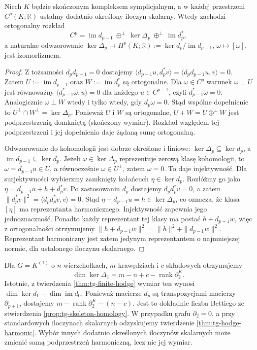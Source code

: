 \begin{twierdzenie}
\label{thm:tg-finite-hodge}
Niech $K$ będzie skończonym kompleksem symplicjalnym,
a w każdej przestrzeni $C^p(K;\mathbb R)$ ustalmy
dodatnio określony iloczyn skalarny. Wtedy zachodzi ortogonalny rozkład
\[
C^p=\operatorname{im}d_{p-1}
\ \oplus^{\perp}\ \ker\Delta_p
\ \oplus^{\perp}\ \operatorname{im}d_p^*,
\]
a naturalne odwzorowanie
$\ker\Delta_p\to H^p(K;\mathbb R)
:=\ker d_p/\operatorname{im}d_{p-1}$,
$\omega\mapsto[\omega]$, jest izomorfizmem.
\end{twierdzenie}

\begin{proof}
Z tożsamości $d_pd_{p-1}=0$ dostajemy
$\langle d_{p-1}u,d_p^*v\rangle
=\langle d_pd_{p-1}u,v\rangle=0$.
Zatem $U:=\operatorname{im}d_{p-1}$ oraz
$W:=\operatorname{im}d_p^*$ są ortogonalne.
Dla $\omega\in C^p$ warunek $\omega\perp U$
jest równoważny
$\langle d_{p-1}^*\omega,u\rangle=0$
dla każdego $u\in C^{p-1}$, czyli
$d_{p-1}^*\omega=0$. Analogicznie
$\omega\perp W$ wtedy i tylko wtedy, gdy
$d_p\omega=0$. Stąd wspólne dopełnienie to
$U^\perp\cap W^\perp=\ker\Delta_p$.
Ponieważ $U$ i $W$ są ortogonalne,
$U+W=U\oplus^\perp W$ jest podprzestrzenią
domkniętą (skończony wymiar).
Rozkład względem tej podprzestrzeni i jej
dopełnienia daje żądaną sumę ortogonalną.

Odwzorowanie do kohomologii jest dobrze określone
i liniowe: $\ker\Delta_p\subseteq\ker d_p$, a
$\operatorname{im}d_{p-1}\subseteq\ker d_p$.
Jeżeli $\omega\in\ker\Delta_p$ reprezentuje zerową
klasę kohomologii, to $\omega=d_{p-1}u\in U$,
a równocześnie $\omega\in U^\perp$, zatem $\omega=0$.
To daje injektywność. Dla surjektywności wybierzmy
zamknięty kołańcuch $\eta\in\ker d_p$. Rozłóżmy go
jako $\eta=d_{p-1}u+h+d_p^*v$.
Po zastosowaniu $d_p$ dostajemy $d_pd_p^*v=0$,
a zatem $\|d_p^*v\|^2
=\langle d_pd_p^*v,v\rangle=0$.
Stąd $\eta-d_{p-1}u=h\in\ker\Delta_p$,
co oznacza, że klasa $[\eta]$ ma reprezentanta
harmonicznego. Injektywność zapewnia jego
jednoznaczność. Ponadto każdy reprezentant tej
klasy ma postać $h+d_{p-1}w$, więc z ortogonalności
otrzymujemy
$\|h+d_{p-1}w\|^2=\|h\|^2+\|d_{p-1}w\|^2$.
Reprezentant harmoniczny jest zatem jedynym
reprezentantem o najmniejszej normie, dla
ustalonego iloczynu skalarnego.
\end{proof}

\begin{uwaga}
Dla $G=K^{(1)}$ o $n$ wierzchołkach, $m$ krawędziach
i $c$ składowych otrzymujemy
\[
\dim\ker\Delta_1=m-n+c-\operatorname{rank}\partial_2^K.
\]
Istotnie, z twierdzenia \ref{thm:tg-finite-hodge}
wymiar ten wynosi $\dim\ker d_1-\dim\operatorname{im}d_0$.
Ponieważ macierze $d_p$ są transpozycjami macierzy
$\partial_{p+1}$, dostajemy
$m-\operatorname{rank}\partial_2^K-(n-c)$.
Jest to dokładnie liczba Bettiego ze stwierdzenia
\ref{prop:tg-skeleton-homology}. W przypadku grafu
$\partial_2=0$, a przy standardowych iloczynach
skalarnych odzyskujemy twierdzenie
\ref{thm:tg-hodge-harmonic}. Wybór innych dodatnio
określonych iloczynów skalarnych może zmienić samą
podprzestrzeń harmoniczną, lecz nie jej wymiar.
\end{uwaga}

